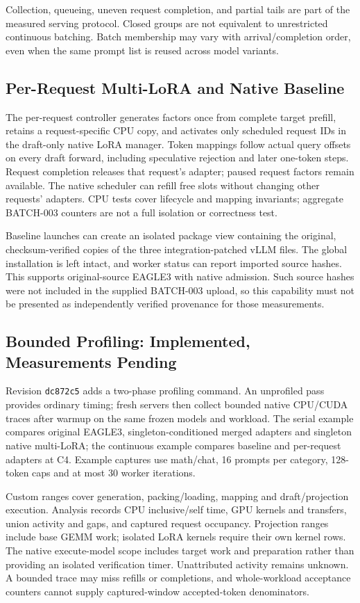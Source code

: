 Collection, queueing, uneven request completion, and partial tails are part of
the measured serving protocol. Closed groups are not equivalent to unrestricted
continuous batching. Batch membership may vary with arrival/completion order,
even when the same prompt list is reused across model variants.

\subsection{Per-Request Multi-LoRA and Native Baseline}
The per-request controller generates factors once from complete target prefill,
retains a request-specific CPU copy, and activates only scheduled request IDs in
the draft-only native LoRA manager. Token mappings follow actual query offsets
on every draft forward, including speculative rejection and later one-token
steps. Request completion releases that request's adapter; paused request factors
remain available. The native scheduler can refill free slots without changing
other requests' adapters. CPU tests cover lifecycle and mapping invariants;
aggregate BATCH-003 counters are not a full isolation or correctness test.

Baseline launches can create an isolated package view containing the original,
checksum-verified copies of the three integration-patched vLLM files. The global
installation is left intact, and worker status can report imported source hashes.
This supports original-source EAGLE3 with native admission. Such source hashes
were not included in the supplied BATCH-003 upload, so this capability must not
be presented as independently verified provenance for those measurements.

\subsection{Bounded Profiling: Implemented, Measurements Pending}
Revision \texttt{dc872c5} adds a two-phase profiling command. An unprofiled pass
provides ordinary timing; fresh servers then collect bounded native CPU/CUDA
traces after warmup on the same frozen models and workload. The serial example
compares original EAGLE3, singleton-conditioned merged adapters and singleton
native multi-LoRA; the continuous example compares baseline and per-request
adapters at C4. Example captures use math/chat, 16 prompts per category,
128-token caps and at most 30 worker iterations.

Custom ranges cover generation, packing/loading, mapping and draft/projection
execution. Analysis records CPU inclusive/self time, GPU kernels and transfers,
union activity and gaps, and captured request occupancy. Projection ranges
include base GEMM work; isolated LoRA kernels require their own kernel rows.
The native execute-model scope includes target work and preparation rather than
providing an isolated verification timer. Unattributed activity remains unknown.
A bounded trace may miss refills or completions, and whole-workload acceptance
counters cannot supply captured-window accepted-token denominators.

